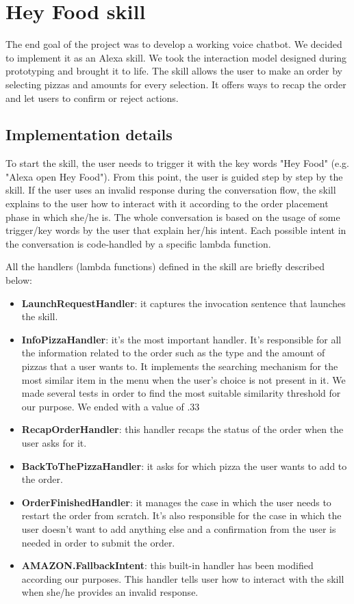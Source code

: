 \section{Hey Food skill}
The end goal of the project was to develop a working voice chatbot.
We decided to implement it as an Alexa skill. We took the interaction model designed during prototyping and brought it to life. The skill allows the user to make an order by selecting pizzas and amounts for every selection. It offers ways to recap the order and let users to confirm or reject actions.

\subsection{Implementation details}

To start the skill, the user needs to trigger it with the key words "Hey Food" (e.g. "Alexa open Hey Food").
From this point, the user is guided step by step  by the skill. If the user uses an invalid response during the conversation flow, the skill explains to the user how to interact with it according to the order placement phase in which she/he is.
The whole conversation is based on the usage of some trigger/key words by the user that explain her/his intent. Each possible intent in the conversation is code-handled by a specific lambda function. 

All the handlers (lambda functions) defined in the skill are briefly described below:

\begin{itemize}

    \item \textbf{LaunchRequestHandler}: it captures the invocation sentence that launches the skill.
    \item \textbf{InfoPizzaHandler}: it's the most important handler. It's responsible for all the information related to the order such as the type and the amount of pizzas that a user wants to. It implements the searching mechanism for the most similar item in the menu when the user's choice is not present in it. We made several tests in order to find the most suitable similarity threshold for our purpose. We ended with a value of .33 
    \item \textbf{RecapOrderHandler}: this handler recaps the status of the order when the user asks for it.
    \item \textbf{BackToThePizzaHandler}: it asks for which pizza the user wants to add to the order.
    \item \textbf{OrderFinishedHandler}: it manages the case in which the user needs to restart the order from scratch. It's also responsible for the case in which the user doesn't want to add anything else and a confirmation from the user is needed in order to submit the order.
    \item \textbf{AMAZON.FallbackIntent}: this built-in handler has been modified according our purposes. This handler tells user how to interact with the skill when she/he provides an invalid response.
    
\end{itemize}
